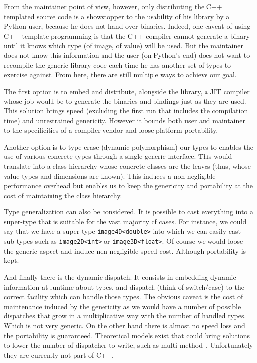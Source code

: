 From the maintainer point of view, however, only distributing the C++ templated source code is a showstopper to the
usability of his library by a Python user, because he does not hand over binaries. Indeed, one caveat of using C++
template programming is that the C++ compiler cannot generate a binary until it knows which type (of image, of value)
will be used. But the maintainer does not know this information and the user (on Python's end) does not want to
recompile the generic library code each time he has another set of types to exercise against. From here, there are still
multiple ways to achieve our goal.

The first option is to embed and distribute, alongside the library, a JIT compiler whose job would be to generate the
binaries and bindings just as they are used. This solution brings speed (excluding the first run that includes the
compilation time) and unrestrained genericity. However it bounds both user and maintainer to the specificities of a
compiler vendor and loose platform portability.

Another option is to type-erase (dynamic polymorphism) our types to enables the use of various concrete types through a
single generic interface. This would translate into a class hierarchy whose concrete classes are the leaves (thus, whose
value-types and dimensions are known). This induces a non-negligible performance overhead but enables us to keep the
genericity and portability at the cost of maintaining the class hierarchy.

Type generalization can also be considered. It is possible to cast everything into a super-type that is suitable for the
vast majority of cases. For instance, we could say that we have a super-type \texttt{image4D<double>} into which we can
easily cast sub-types such as \texttt{image2D<int>} or \texttt{image3D<float>}. Of course we would loose the generic
aspect and induce non negligible speed cost. Although portability is kept.

And finally there is the dynamic dispatch. It consists in embedding dynamic information at runtime about types, and
dispatch (think of switch/case) to the correct facility which can handle those types. The obvious caveat is the cost of
maintenance induced by the genericity as we would have a number of possible dispatches that grow in a multiplicative way
with the number of handled types. Which is not very generic. On the other hand there is almost no speed loss and the
portability is guaranteed. Theoretical models exist that could bring solutions to lower the number of dispatcher to
write, such as multi-method~\cite{pirkelbauer.2010.multimethods}. Unfortunately they are currently not part of C++.

